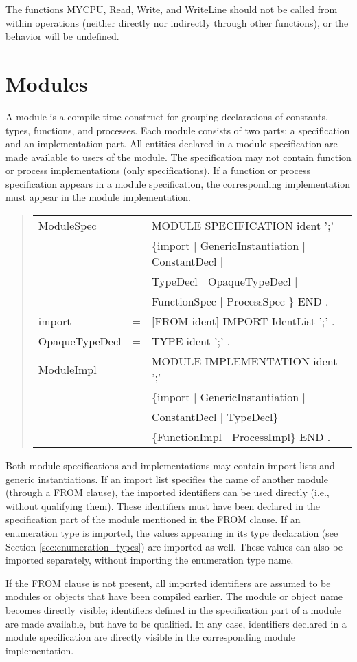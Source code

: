 \documentclass[10pt]{article}
\newenvironment{grammar}
{\begin{quote} \begin{tabular}{p{3.8cm} l l}}
{\end{tabular}\end{quote}}
\begin{document}
The functions MYCPU, Read, Write, and WriteLine should not be called from
within operations (neither directly nor indirectly through other functions),
or the behavior will be undefined.
\section{Modules}\label{sec:modules}

A module is a compile-time construct for grouping declarations of
constants, types, functions, and processes.
Each module consists of two parts: a specification and
an implementation part.
All entities declared in a module specification are made available
to users of the module.
The specification may not contain function or process implementations (only
specifications).
If a function or process specification appears in a module specification, the
corresponding implementation must appear in the module implementation.
\begin{grammar}
ModuleSpec & = & MODULE SPECIFICATION ident ';' \\
& & \{import $|$ GenericInstantiation $|$ ConstantDecl $|$ \\
& &  TypeDecl $|$ OpaqueTypeDecl $|$ \\
& & FunctionSpec $|$ ProcessSpec \} END . \\
import & = & [FROM ident] IMPORT IdentList ';' . \\
OpaqueTypeDecl & = & TYPE ident ';' . \\
ModuleImpl & = & MODULE IMPLEMENTATION ident ';' \\
& & \{import $|$ GenericInstantiation $|$ \\
& & ConstantDecl $|$ TypeDecl\} \\
& & \{FunctionImpl $|$ ProcessImpl\} END .
\end{grammar}

Both module specifications and implementations may contain import lists
and generic instantiations.
If an import list specifies the name of another module (through
a FROM clause), the imported identifiers can be used directly (i.e., without
qualifying them). These identifiers must have been declared in the
specification part of the module mentioned in the FROM clause.
If an enumeration type is imported, the values appearing in
its type declaration (see Section \ref{sec:enumeration_types}) are imported as well.
These values can also be imported separately, without importing
the enumeration type name.

If the FROM clause is not present, all imported identifiers
are assumed to be modules or objects that have been compiled earlier.
The module or object name becomes directly visible; identifiers defined
in the specification part of a module are made available, but have to
be qualified.
In any case, identifiers declared in a module specification are directly
visible in the corresponding module implementation.
\end{document}
